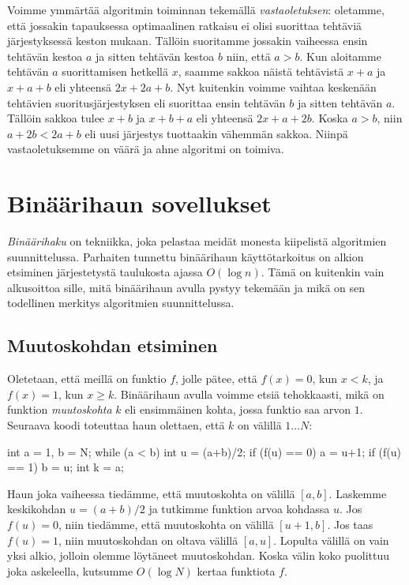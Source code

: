 Voimme ymmärtää algoritmin toiminnan tekemällä \emph{vastaoletuksen}:
oletamme, että jossakin tapauksessa optimaalinen ratkaisu
ei olisi suorittaa tehtäviä järjestyksessä keston mukaan.
Tällöin suoritamme jossakin vaiheessa ensin tehtävän kestoa $a$
ja sitten tehtävän kestoa $b$ niin, että $a>b$.
Kun aloitamme tehtävän $a$ suorittamisen hetkellä $x$,
saamme sakkoa näistä tehtävistä $x+a$ ja $x+a+b$ eli yhteensä $2x+2a+b$.
Nyt kuitenkin voimme vaihtaa keskenään tehtävien suoritusjärjestyksen
eli suorittaa ensin tehtävän $b$ ja sitten tehtävän $a$.
Tällöin sakkoa tulee $x+b$ ja $x+b+a$ eli yhteensä $2x+a+2b$.
Koska $a>b$, niin $a+2b < 2a+b$ eli uusi järjestys tuottaakin
vähemmän sakkoa.
Niinpä vastaoletuksemme on väärä ja ahne algoritmi on toimiva.

\section{Binäärihaun sovellukset}

\emph{Binäärihaku} on tekniikka, joka pelastaa meidät monesta
kiipelistä algoritmien suunnittelussa.
Parhaiten tunnettu binäärihaun käyttötarkoitus on alkion
etsiminen järjestetystä taulukosta ajassa $O(\log n)$.
Tämä on kuitenkin vain alkusoittoa sille,
mitä binäärihaun avulla pystyy tekemään ja mikä on sen
todellinen merkitys algoritmien suunnittelussa.

\subsection{Muutoskohdan etsiminen}

Oletetaan, että meillä on funktio $f$,
jolle pätee, että $f(x)=0$, kun $x<k$,
ja $f(x)=1$, kun $x \ge k$.
Binäärihaun avulla voimme etsiä tehokkaasti,
mikä on funktion \emph{muutoskohta} $k$
eli ensimmäinen kohta, jossa funktio saa arvon $1$.
Seuraava koodi toteuttaa haun olettaen,
että $k$ on välillä $1 \dots N$:


\begin{code}
int a = 1, b = N;
while (a < b) {
    int u = (a+b)/2;
    if (f(u) == 0) a = u+1;
    if (f(u) == 1) b = u;
}
int k = a;
\end{code}

Haun joka vaiheessa tiedämme, että muutoskohta on välillä $[a,b]$.
Laskemme keskikohdan $u=(a+b)/2$ ja tutkimme funktion arvoa kohdassa $u$.
Jos $f(u)=0$, niin tiedämme, että muutoskohta on välillä $[u+1,b]$.
Jos taas $f(u)=1$, niin muutoskohdan on oltava välillä $[a,u]$.
Lopulta välillä on vain yksi alkio, jolloin olemme löytäneet muutoskohdan.
Koska välin koko puolittuu joka askeleella,
kutsumme $O(\log N)$ kertaa funktiota $f$.

